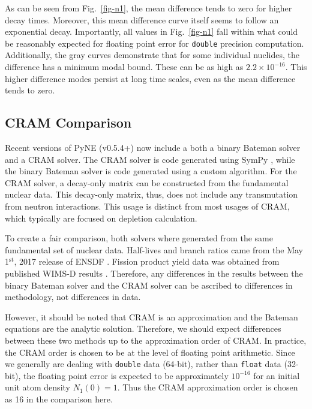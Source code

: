 \documentclass[letterpaper]{physor2018}
\begin{document}
As can be seen from Fig.~\ref{fig-n1}, the mean difference tends to zero for
higher decay times.  Moreover, this mean difference curve itself seems to
follow an exponential decay. Importantly, all values in Fig.~\ref{fig-n1}
fall within what could be reasonably expected for floating point error for
\texttt{double} precision computation. Additionally, the gray curves
demonstrate that for some individual nuclides, the difference has a minimum
modal bound. These can be as high as $2.2\times 10^{-16}$. This higher
difference modes persist at long time scales, even as the mean difference
tends to zero.

\subsection{CRAM Comparison}
\label{subsec-cram}
Recent versions of PyNE (v0.5.4+)
now include a both a binary Bateman solver and a CRAM solver.
The CRAM solver is code generated using SymPy \cite{10.7717/peerj-cs.103},
while the binary Bateman solver is code generated using a custom algorithm.
For the CRAM solver, a decay-only matrix can be constructed from the
fundamental nuclear data. This decay-only matrix, thus, does not include
any transmutation from neutron interactions. This usage is distinct from
most usages of CRAM, which typically are focused on depletion calculation.

To create a fair comparison, both solvers where generated from the same
fundamental set of nuclear data. Half-lives and branch
ratios came from the May 1$^{\mathrm{st}}$, 2017 release of ENSDF
\cite{Bhat1992,ensdfmaintained}. Fission product yield data was obtained
from published WIMS-D results \cite{aldama2003wims}. Therefore, any differences
in the results between the binary Bateman solver and the CRAM
solver can be ascribed to differences in methodology, not differences in data.

However, it should be noted that CRAM is an approximation and the Bateman
equations are the analytic solution. Therefore, we should expect differences
between these two methods up to the approximation order of CRAM. In practice,
the CRAM order is chosen to be at the level of floating point arithmetic.
Since we generally are dealing with \texttt{double} data (64-bit), rather than
\texttt{float} data (32-bit), the floating point error is expected to be
approximately $10^{-16}$ for an initial unit atom density $N_1(0) = 1$.
Thus the CRAM approximation order is chosen as 16 in the comparison here.
\end{document}

